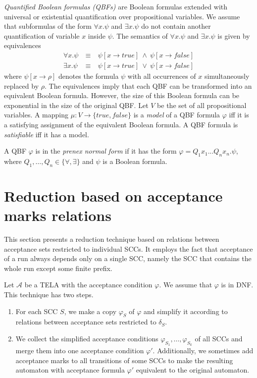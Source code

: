\documentclass[runningheads]{llncs}
\def\false{\mathit{false}}
\def\true{\mathit{true}}
\newcommand{\mA}{\mathcal{A}}
\begin{document}

\bigskip

\emph{Quantified Boolean formulas (QBFs)} are Boolean formulas
extended with universal or existential quantification over
propositional variables. We assume that subformulas of the form
$\forall x.\psi$ and $\exists x.\psi$ do not contain another
quantification of variable $x$ inside $\psi$. The semantics of
$\forall x.\psi$ and $\exists x.\psi$ is given by equivalences
\[
  \begin{array}{rcl}
    \forall x.\psi &~\equiv~& \psi[x\rightarrow\true]~\wedge~\psi[x\rightarrow\false]\\
    \exists x.\psi &~\equiv~& \psi[x\rightarrow\true]~\vee~   \psi[x\rightarrow\false]
  \end{array}
\]
where $\psi[x\rightarrow \rho]$ denotes the formula $\psi$ with all
occurrences of $x$ simultaneously replaced by $\rho$. The equivalences
imply that each QBF can be transformed into an equivalent Boolean
formula. However, the size of this Boolean formula can be exponential
in the size of the original QBF. Let $V$ be the set of all
propositional variables. A mapping $\mu:V\rightarrow\{\true,\false\}$
is a \emph{model} of a QBF formula $\varphi$ iff it is a satisfying
assignment of the equivalent Boolean formula. A QBF formula is
\emph{satisfiable} iff it has a model.

A QBF $\varphi$ is in the \emph{prenex normal form} if it has the form
$\varphi = Q_{1}x_{1}...Q_{n}x_{n} . \psi$, where
$Q_1,\ldots,Q_n \in \{\forall, \exists\}$ and $\psi$ is a Boolean
formula.


\section{Reduction based on acceptance marks relations}\label{sec:standard}

This section presents a reduction technique based on relations between
acceptance sets restricted to individual SCCs. It employs the fact
that acceptance of a run always depends only on a single SCC, namely
the SCC that contains the whole run except some finite prefix.

Let $\mA$ be a TELA with the acceptance condition $\varphi$. We assume
that $\varphi$ is in DNF. This technique has two steps.
\begin{enumerate}
\item For each SCC $S$, we make a copy $\varphi_S$ of $\varphi$ and
  simplify it according to relations between acceptance sets
  restricted to $\delta_S$. 
\item We collect the simplified acceptance conditions
  $\varphi_{S_1},\ldots,\varphi_{S_k}$ of all SCCs and merge them into
  one acceptance condition $\varphi'$. Additionally, we sometimes add
  acceptance marks to all transitions of some SCCs to make the
  resulting automaton with acceptance formula $\varphi'$ equivalent to
  the original automaton.
\end{enumerate}
\end{document}
